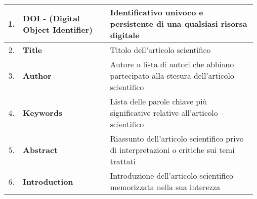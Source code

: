 \begin{table}[H]
    \begin{tabularx}{\textwidth}{|c|X|X|}
            \hline
            \small 1. & \small \textbf{DOI - (Digital Object Identifier)} & \small Identificativo univoco e persistente di una qualsiasi risorsa digitale \\
            \hline
            \small 2. & \small \textbf{Title} & \small Titolo dell'articolo scientifico \\
            \hline
            \small 3. & \textbf{Author} & \small Autore o lista di autori che abbiano partecipato alla stesura dell'articolo scientifico \\
            \hline
            \small 4. & \small \textbf{Keywords} & \small Lista delle parole chiave più significative relative all'articolo scientifico \\
            \hline
            \small 5. & \small \textbf{Abstract} & \small Riassunto dell'articolo scientifico privo di interpretazioni o critiche sui temi trattati \\
            \hline
            \small 6. & \small \textbf{Introduction} & \small Introduzione dell'articolo scientifico memorizzata nella sua interezza \\
            \hline
    \end{tabularx}
\end{table}